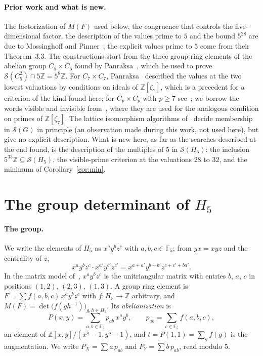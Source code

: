 \documentclass[11pt]{article}
\theoremstyle{definition}
\theoremstyle{remark}
\newcommand{\F}{\mathbb F_5}
\newcommand{\Z}{\mathbb Z}
\newcommand{\cS}{\mathcal S}
\begin{document}
\paragraph{Prior work and what is new.}
The factorization of $M(F)$ used below, the congruence that controls the
five-dimensional factor, the description of the values prime to $5$ and the
bound $5^{28}$ are due to Mossinghoff and Pinner~\cite{mp}; the explicit values
prime to $5$ come from their Theorem~3.3. The constructions start from the three
group ring elements of the abelian group $C_5\times C_5$ found by
Panraksa~\cite[Proposition~3.1]{pan25}, which he used to prove
$\cS(C_5^2)\cap5\Z=5^8\Z$. For $C_7\times C_7$, Panraksa~\cite{pan49}
described the values at the two lowest valuations by conditions on ideals of
$\Z[\zeta_7]$, which is a precedent for a criterion of the kind found here; for
$C_p\times C_p$ with $p\ge7$ see~\cite{panp}; we borrow the words visible and
invisible from~\cite{pan49}, where they are used for the analogous condition
on primes of $\Z[\zeta_7]$. The lattice isomorphism algorithms of~\cite{bhj} decide membership in
$\cS(G)$ in principle (an observation made during this work, not used here),
but give no explicit description. What is new
here, as far as the searches described at the end found, is the description of
the multiples of $5$ in $\cS(H_5)$: the inclusion $5^{33}\Z\subseteq\cS(H_5)$,
the visible-prime criterion at the valuations $28$ to $32$, and the minimum of
Corollary~\ref{cor:min}.

\section{The group determinant of \texorpdfstring{$H_5$}{H5}}\label{sec:factor}

\paragraph{The group.} We write the elements of $H_5$ as $x^ay^bz^c$ with
$a,b,c\in\F$; from $yx=xyz$ and the centrality of $z$,
\[
x^ay^bz^c\cdot x^{a'}y^{b'}z^{c'}=x^{a+a'}y^{b+b'}z^{c+c'+ba'} .
\]
In the matrix model of~\cite[p.~4]{mp}, $x^ay^bz^c$ is the unitriangular
matrix with entries $b$, $a$, $c$ in positions $(1,2)$, $(2,3)$, $(1,3)$. A
group ring element is $F=\sum f(a,b,c)\,x^ay^bz^c$ with $f:H_5\to\Z$
arbitrary, and $M(F)=\det\bigl(f(gh^{-1})\bigr)_{g,h\in H_5}$. Its
\emph{abelianization} is
\[
P(x,y)=\sum_{a,b\in\F}p_{ab}\,x^ay^b,\qquad p_{ab}=\sum_{c\in\F}f(a,b,c),
\]
an element of $\Z[x,y]/(x^5-1,y^5-1)$, and $t=P(1,1)=\sum_gf(g)$ is the
augmentation. We write $P_X=\sum a\,p_{ab}$ and $P_Y=\sum b\,p_{ab}$, read
modulo $5$.
\end{document}
